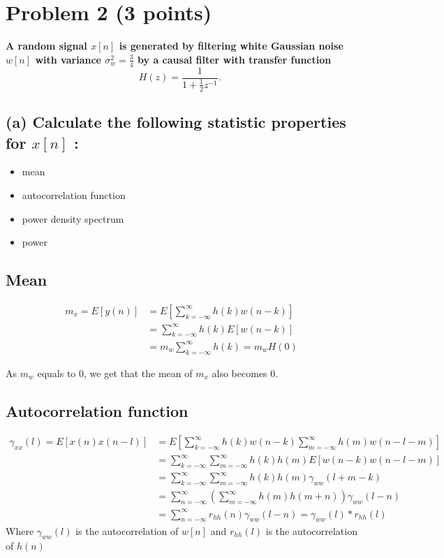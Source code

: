 \section{Problem 2 (3 points)}
\textbf{A random signal $x[n]$ is generated by filtering white Gaussian noise $w[n]$ with variance $\sigma_w^2=\frac{3}{4}$ by a causal filter with transfer function}
$$
H(z)=\frac{1}{1+\frac{1}{2} z^{-1}} \text {. }
$$
\subsection*{(a) Calculate the following statistic properties for $x[n]$ :}
\begin{itemize}
    \item mean
    \item autocorrelation function
    \item power density spectrum
    \item power
\end{itemize}

\subsection*{Mean}
$$\begin{aligned} m_x =E[y(n)] & =E\left[\sum_{k=-\infty}^{\infty} h(k) w(n-k)\right] \\ & =\sum_{k=-\infty}^{\infty} h(k) E[w(n-k)] \\ & =m_w \sum_{k=-\infty}^{\infty} h(k)=m_w H(0)\end{aligned}$$

As $m_w$ equals to 0, we get that the mean of $m_x$ also becomes 0.

\subsection*{Autocorrelation function}
$$
\begin{aligned}
\gamma_{x x}(l)  =E[x(n) x(n-l)] & =E\left[\sum_{k=-\infty}^{\infty} h(k) w(n-k) \sum_{m=-\infty}^{\infty} h(m) w(n-l-m)\right] \\
& =\sum_{k=-\infty}^{\infty} \sum_{m=-\infty}^{\infty} h(k) h(m) E[w(n-k) w(n-l-m)] \\
& =\sum_{k=-\infty}^{\infty} \sum_{m=-\infty}^{\infty} h(k) h(m) \gamma_{w w}(l+m-k) \\
& =\sum_{n=-\infty}^{\infty}\left(\sum_{m=-\infty}^{\infty} h(m) h(m+n)\right) \gamma_{w w}(l-n) \\
& =\sum_{n=-\infty}^{\infty} r_{h h}(n) \gamma_{w w}(l-n)=\gamma_{w w}(l) * r_{h h}(l)
\end{aligned}
$$
Where  $\gamma_{w w}(l)$ is the autocorrelation of $w[n]$ and $r_{h h}(l)$ is the autocorrelation of $h(n)$

